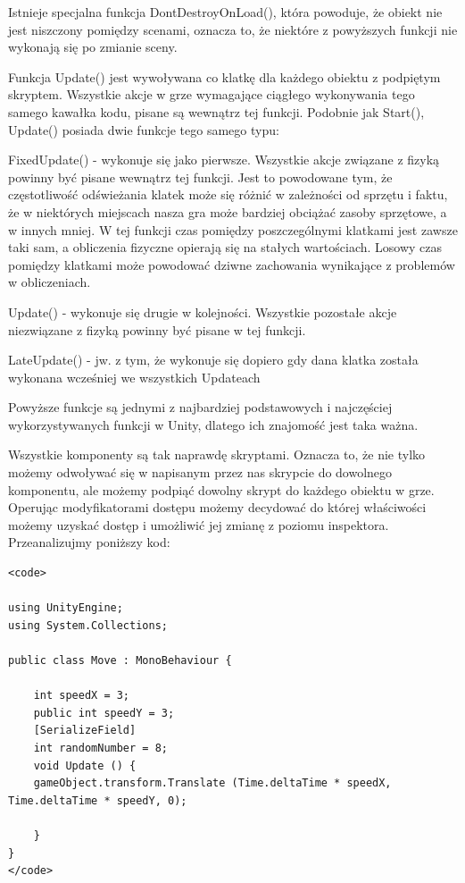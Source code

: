 \documentclass[brudnopis]{xmgr}
\begin{document}
Istnieje specjalna funkcja DontDestroyOnLoad(), która powoduje, że obiekt nie jest niszczony pomiędzy scenami, oznacza to, że niektóre z powyższych funkcji nie wykonają się po zmianie sceny.

Funkcja Update() jest wywoływana co klatkę dla każdego obiektu z podpiętym skryptem. Wszystkie akcje w grze wymagające ciągłego wykonywania tego samego kawałka kodu, pisane są wewnątrz tej funkcji. Podobnie jak Start(), Update() posiada dwie funkcje tego samego typu:

FixedUpdate() - wykonuje się jako pierwsze. Wszystkie akcje związane z fizyką powinny być pisane wewnątrz tej funkcji. Jest to powodowane tym, że częstotliwość odświeżania klatek może się różnić w zależności od sprzętu i faktu, że w niektórych miejscach nasza gra może bardziej obciążać zasoby sprzętowe, a w innych mniej. W tej funkcji czas pomiędzy poszczególnymi klatkami jest zawsze taki sam, a obliczenia fizyczne opierają się na stałych wartościach. Losowy czas pomiędzy klatkami może powodować dziwne zachowania wynikające z problemów w obliczeniach.

Update() - wykonuje się drugie w kolejności. Wszystkie pozostałe akcje niezwiązane z fizyką powinny być pisane w tej funkcji.

LateUpdate() - jw. z tym, że wykonuje się dopiero gdy dana klatka została wykonana wcześniej we wszystkich Updateach

Powyższe funkcje są jednymi z najbardziej podstawowych i najczęściej wykorzystywanych funkcji w Unity, dlatego ich znajomość jest taka ważna.

Wszystkie komponenty są tak naprawdę skryptami. Oznacza to, że nie tylko możemy odwoływać się w napisanym przez nas skrypcie do dowolnego komponentu, ale możemy podpiąć dowolny skrypt do każdego obiektu w grze. Operując modyfikatorami dostępu możemy decydować do której właściwości możemy uzyskać dostęp i umożliwić jej zmianę z poziomu inspektora. Przeanalizujmy poniższy kod:


\begin{lstlisting}
<code>

using UnityEngine;
using System.Collections;

public class Move : MonoBehaviour {

	int speedX = 3;
	public int speedY = 3;
	[SerializeField]
	int randomNumber = 8;
	void Update () {
	gameObject.transform.Translate (Time.deltaTime * speedX, Time.deltaTime * speedY, 0);

	}
}
</code>
\end{lstlisting}
\end{document}
